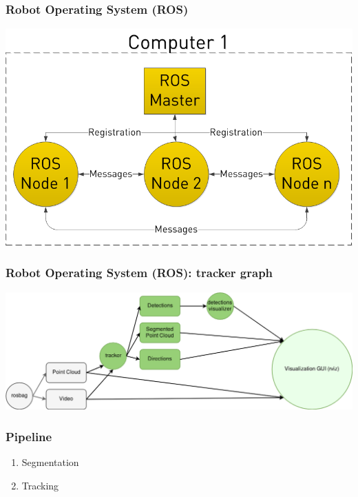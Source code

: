 \documentclass[xcolor=table,usenames,dvipsnames]{beamer}
\begin{document}
\begin{frame}
\frametitle{Robot Operating System (ROS)}
\includegraphics[height = 0.7\textheight]{img/ros.png}
\begin{flushright}
\end{flushright}
\end{frame}
\begin{frame}
\frametitle{Robot Operating System (ROS): tracker graph}
\includegraphics[width = \textwidth]{img/ros_graph.png}
\end{frame}
\begin{frame}
\frametitle{Pipeline}
\begin{enumerate}
\item Segmentation
\item Tracking
\end{enumerate}
\end{frame}
\end{document}
